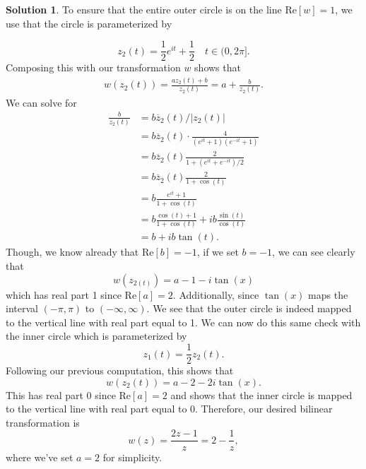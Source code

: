 \documentclass[12pt]{article}
\newcommand{\abs}[1]{ \left| #1 \right| }
\renewcommand{\Re}{\text{Re}}
\theoremstyle{definition}
\newtheorem{sol}{Solution}
\theoremstyle{remark}
\begin{document}
\begin{sol}
To ensure that the entire outer circle is on the line $\Re[w] = 1$, we use that the circle is parameterized by

\begin{equation*}
    z_{2}(t) = \frac{1}{2} e^{it} + \frac{1}{2} \quad t\in(0,2\pi].
\end{equation*}
Composing this with our transformation $w$ shows that
\begin{align*}
    w(z_{2}(t)) = \frac{az_{2}(t)+b}{z_{2}(t)} = a + \frac{b}{z_{2}(t)}.  
\end{align*}
We can solve for 
\begin{align*}
    \frac{b}{z_{2}(t)} &= b \overline{z}_{2}(t) / \abs{z_{2}(t)} \\
                       &= b \overline{z}_{2}(t)  \cdot \frac{4}{(e^{it}+1)(e^{-it}+1)}\\
                       &= b \overline{z}_{2}(t) \frac{2}{1 + (e^{it} + e^{-it}) / 2}\\
                       &= b \overline{z}_{2}(t) \frac{2}{1 + \cos(t)}\\
                       &= b \frac{e^{it} + 1}{1 + \cos(t)} \\
                       &= b \frac{\cos(t) + 1}{1 +\cos(t)}  + ib \frac{\sin(t)}{\cos(t)}\\
                       &= b + ib \tan(t).
\end{align*}
Though, we know already that $\Re[b] = -1$, if we set $b=-1$, we can see clearly that
\begin{equation*}
    w(z_{2(t)}) = a -  1 - i \tan(x)
\end{equation*}
which has real part 1 since $\Re[a] = 2$. Additionally, since $\tan(x)$ maps the interval $(-\pi, \pi)$ to $(-\infty, \infty )$. We see that the outer circle is indeed mapped to the vertical line with real part equal to 1. We can now do this same check with the inner circle which is parameterized by
\begin{equation*}
    z_{1}(t) = \frac{1}{2} z_{2}(t).
\end{equation*}
Following our previous computation, this shows that
\begin{equation*}
    w(z_{2}(t)) = a - 2 - 2i \tan(x).
\end{equation*}
This has real part 0 since $\Re[a] = 2$ and shows that the inner circle is mapped to the vertical line with real part equal to 0. Therefore, our desired bilinear transformation is
\begin{equation*}
    w(z) = \frac{2z-1}{z} = 2 - \frac{1}{z},
\end{equation*}
where we've set $a = 2$ for simplicity.
\end{sol}
\end{document}
